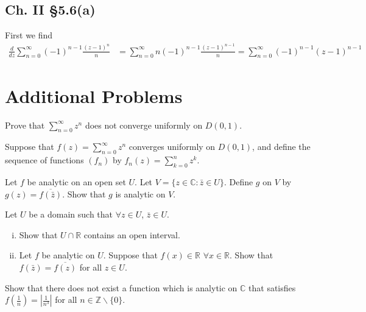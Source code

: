 \documentclass{article}
\newcounter{Problem}
\newenvironment{Problem}{\begin{Exercise}[name={Problem},
                                          counter={Problem}]}
                        {\end{Exercise}}
\begin{document}
\subsection*{Ch. II \S 5.6(a)}
First we find
\begin{align*}
   \frac{d}{dz} \sum_{n=0}^\infty (-1)^{n-1} \frac{(z-1)^n}{n}
&= \sum_{n=0}^\infty n (-1)^{n-1} \frac{(z-1)^{n-1}}{n}
 = \sum_{n=0}^\infty (-1)^{n-1} (z-1)^{n-1}
\end{align*}

\section{Additional Problems}

\begin{Problem}
  Prove that $\sum_{n=0}^\infty z^n$ does not converge uniformly on
  $D(0, 1)$.
\end{Problem}

\begin{Answer}
  Suppose that $f(z) = \sum_{n=0}^\infty z^n$ converges uniformly on $D(0,1)$,
  and define the sequence of functions $(f_n)$ by
  $f_n(z) = \sum_{k=0}^n z^k$.
\end{Answer}

\begin{Problem}
  Let $f$ be analytic on an open set $U$. Let
  $V = \{ z \in \mathbb{C} : \bar{z} \in U \}$. Define $g$ on $V$ by
  $g(z) = \overline{f(\bar{z})}$. Show that $g$ is analytic on $V$.
\end{Problem}

\begin{Problem}
  Let $U$ be a domain such that $\forall z \in U$, $\bar{z} \in U$.
  \begin{enumerate}[(i)]
    \item{
      Show that $U \cap \mathbb{R}$ contains an open interval.
    }
    \item{
      Let $f$ be analytic on $U$. Suppose that $f(x) \in \mathbb{R}$
      $\forall x \in \mathbb{R}$. Show that $f(\bar{z}) = \overline{f(z)}$
      for all $z \in U$.
    }
  \end{enumerate}
\end{Problem}

\begin{Problem}
  Show that there does not exist a function which is analytic on
  $\mathbb{C}$ that satisfies
  $f\left(\frac{1}{n}\right) = \left|\frac{1}{n^3}\right|$ for all
  $n \in \mathbb{Z} \backslash \{ 0 \}$.
\end{Problem}
\end{document}
